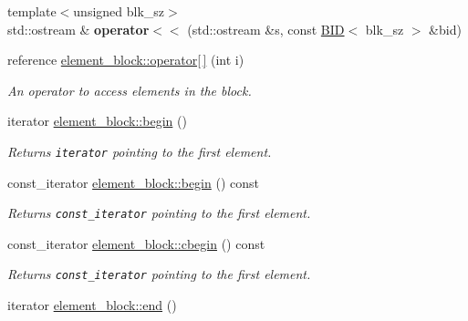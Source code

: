 \begin{CompactItemize}
\item 
\hypertarget{group__mnglayer_ga8c145a25d05384fd7ef06c00d185257}{
{\footnotesize template$<$unsigned blk\_\-sz$>$ }\\std::ostream \& \textbf{operator$<$$<$} (std::ostream \&s, const \hyperlink{structBID}{BID}$<$ blk\_\-sz $>$ \&bid)}
\label{group__mnglayer_ga8c145a25d05384fd7ef06c00d185257}

\item 
\hypertarget{group__mnglayer_gb90a755bf03c0113dd37014f6f8dc53d}{
reference \hyperlink{group__mnglayer_gb90a755bf03c0113dd37014f6f8dc53d}{element\_\-block::operator\mbox{[}$\,$\mbox{]}} (int i)}
\label{group__mnglayer_gb90a755bf03c0113dd37014f6f8dc53d}

\begin{CompactList}\small\item\em An operator to access elements in the block. \item\end{CompactList}\item 
\hypertarget{group__mnglayer_gcae10d17bbcc8af7c10ef052283aa7e9}{
iterator \hyperlink{group__mnglayer_gcae10d17bbcc8af7c10ef052283aa7e9}{element\_\-block::begin} ()}
\label{group__mnglayer_gcae10d17bbcc8af7c10ef052283aa7e9}

\begin{CompactList}\small\item\em Returns {\tt iterator} pointing to the first element. \item\end{CompactList}\item 
\hypertarget{group__mnglayer_gd5a7afcaa6b7c4762e831c43648fb5af}{
const\_\-iterator \hyperlink{group__mnglayer_gd5a7afcaa6b7c4762e831c43648fb5af}{element\_\-block::begin} () const }
\label{group__mnglayer_gd5a7afcaa6b7c4762e831c43648fb5af}

\begin{CompactList}\small\item\em Returns {\tt const\_\-iterator} pointing to the first element. \item\end{CompactList}\item 
\hypertarget{group__mnglayer_gbc98bc4725bb92fc30627633816097ef}{
const\_\-iterator \hyperlink{group__mnglayer_gbc98bc4725bb92fc30627633816097ef}{element\_\-block::cbegin} () const }
\label{group__mnglayer_gbc98bc4725bb92fc30627633816097ef}

\begin{CompactList}\small\item\em Returns {\tt const\_\-iterator} pointing to the first element. \item\end{CompactList}\item 
\hypertarget{group__mnglayer_g1b89fe04df5d14b3e1cf536298331413}{
iterator \hyperlink{group__mnglayer_g1b89fe04df5d14b3e1cf536298331413}{element\_\-block::end} ()}
\label{group__mnglayer_g1b89fe04df5d14b3e1cf536298331413}


\end{CompactItemize}

